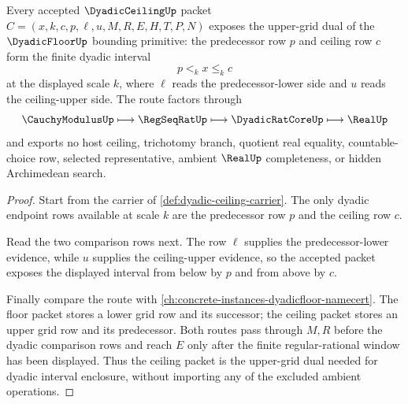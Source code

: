 \begin{theorem}
\label{thm:dyadic-ceiling-floor-dual-route}
Every accepted $\DyadicCeilingUp$ packet $C=(x,k,c,p,\ell,u,M,R,E,H,T,P,N)$ exposes the upper-grid dual of the $\DyadicFloorUp$ bounding primitive: the predecessor row $p$ and ceiling row $c$ form the finite dyadic interval
$$
p<_k x\leq_k c
$$
at the displayed scale $k$, where $\ell$ reads the predecessor-lower side and $u$ reads the ceiling-upper side. The route factors through
$$
\CauchyModulusUp\longmapsto \RegSeqRatUp\longmapsto \DyadicRatCoreUp\longmapsto \RealUp
$$
and exports no host ceiling, trichotomy branch, quotient real equality, countable-choice row, selected representative, ambient $\RealUp$ completeness, or hidden Archimedean search.
\end{theorem}
\begin{proof}
Start from the carrier of \autoref{def:dyadic-ceiling-carrier}. The only dyadic endpoint rows available at scale $k$ are the predecessor row $p$ and the ceiling row $c$.

Read the two comparison rows next. The row $\ell$ supplies the predecessor-lower evidence, while $u$ supplies the ceiling-upper evidence, so the accepted packet exposes the displayed interval from below by $p$ and from above by $c$.

Finally compare the route with \autoref{ch:concrete-instances-dyadicfloor-namecert}. The floor packet stores a lower grid row and its successor; the ceiling packet stores an upper grid row and its predecessor. Both routes pass through $M,R$ before the dyadic comparison rows and reach $E$ only after the finite regular-rational window has been displayed. Thus the ceiling packet is the upper-grid dual needed for dyadic interval enclosure, without importing any of the excluded ambient operations.
\end{proof}



